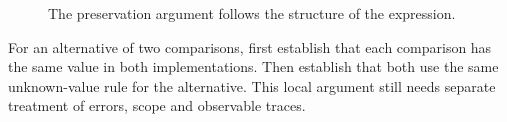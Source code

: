 \begin{figure}[H]
\centering
{}
\caption{The preservation argument follows the structure of the expression.}\label{fig:teach-M03-08}
\end{figure}

For an alternative of two comparisons, first establish that each comparison has the same value in both implementations. Then establish that both use the same unknown-value rule for the alternative. This local argument still needs separate treatment of errors, scope and observable traces.


